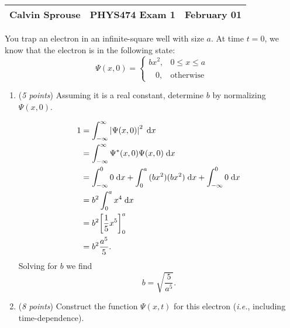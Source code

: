\documentclass[a4paper, 12pt]{config/homework}
\begin{document}
\noindent
\begin{tabularx}{\textwidth}{>{\centering\arraybackslash}X>{\centering\arraybackslash}X>{\centering\arraybackslash}X}
Calvin Sprouse & PHYS474 Exam 1 & 2024 February 01\\
\midrule
\end{tabularx}

\noindent
You trap an electron in an infinite-square well with size \(a\). At time \(t=0\), we know that the electron is in the following state:
\[\Psi(x,0) = \begin{cases}
    bx^2, & 0 \le x \le a \\
    \phantom{b^2}0, & \text{otherwise}
\end{cases}\]
\begin{enumerate}[label=(\alph*)]
\item (\textit{5 points}) Assuming it is a real constant, determine \(b\) by normalizing \(\Psi(x,0)\).

\begin{align*}
1 &= \bint{-\infty}{\infty}{\left|\Psi(x,0)\right|^2}{x}
\\&= \bint{-\infty}{\infty}{\Psi^*(x,0)\Psi(x,0)}{x}
\\&= \bint{-\infty}{0}{0}{x} + \bint{0}{a}{(bx^2)(bx^2)}{x} + \bint{-\infty}{0}{0}{x}
\\&= b^2 \bint{0}{a}{x^4}{x}
\\&= b^2 {\left[ \frac{1}{5}x^5 \right]}_0^a
\\&= b^2 \frac{a^5}{5}.
\end{align*}
Solving for \(b\) we find
\[b = \sqrt{\frac{5}{a^5}}.\]

\pagebreak
\item (\textit{8 points}) Construct the function \(\Psi(x,t)\) for this electron (\textit{i.e.}, including time-dependence).


\end{enumerate}
\end{document}
